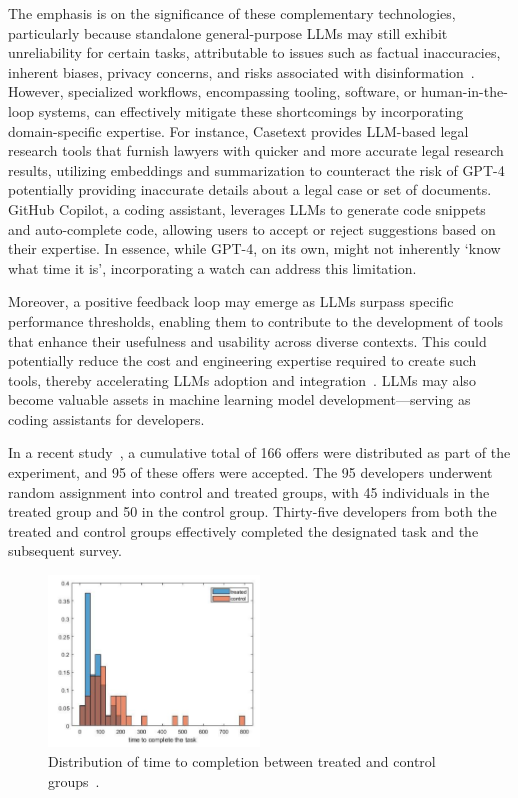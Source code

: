 \documentclass[a4paper,oneside]{book}
\begin{document}
The emphasis is on the significance of these complementary technologies, particularly because standalone general-purpose LLMs may still exhibit unreliability for certain tasks, attributable to issues such as factual inaccuracies, inherent biases, privacy concerns, and risks associated with disinformation~\cite{abid2021persistent, schramowski2022large, goldstein2023generative}. However, specialized workflows, encompassing tooling, software, or human-in-the-loop systems, can effectively mitigate these shortcomings by incorporating domain-specific expertise. For instance, Casetext provides LLM-based legal research tools that furnish lawyers with quicker and more accurate legal research results, utilizing embeddings and summarization to counteract the risk of GPT-4 potentially providing inaccurate details about a legal case or set of documents. GitHub Copilot, a coding assistant, leverages LLMs to generate code snippets and auto-complete code, allowing users to accept or reject suggestions based on their expertise. In essence, while GPT-4, on its own, might not inherently `know what time it is', incorporating a watch can address this limitation.

Moreover, a positive feedback loop may emerge as LLMs surpass specific performance thresholds, enabling them to contribute to the development of tools that enhance their usefulness and usability across diverse contexts. This could potentially reduce the cost and engineering expertise required to create such tools, thereby accelerating LLMs adoption and integration~\cite{chen2021evaluating, peng2023impact}. LLMs may also become valuable assets in machine learning model development—serving as coding assistants for developers.

In a recent study~\cite{peng2023impact}, a cumulative total of 166 offers were distributed as part of the experiment, and 95 of these offers were accepted. The 95 developers underwent random assignment into control and treated groups, with 45 individuals in the treated group and 50 in the control group. Thirty-five developers from both the treated and control groups effectively completed the designated task and the subsequent survey.

\begin{figure}[H]
    \centering
    \includegraphics[width=0.5\textwidth]{img/task_completion_time}
    \caption{Distribution of time to completion between treated and control groups~\cite{peng2023impact}.}\label{fig:task_completion_time}
\end{figure}
\end{document}
